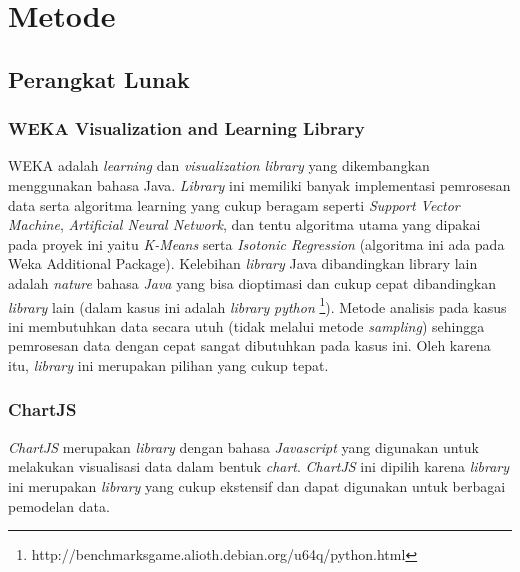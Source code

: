 \documentclass{article}
\begin{document}
\section{Metode}

\subsection{Perangkat Lunak}

\subsubsection{WEKA Visualization and Learning Library}
\begin{adjustwidth}{4em}{0pt}

\hspace{\parindent}WEKA adalah \textit{learning} dan \textit{visualization} \textit{library} yang dikembangkan menggunakan bahasa Java. \textit{Library} ini memiliki banyak implementasi pemrosesan data serta algoritma learning yang cukup beragam seperti \textit{Support Vector Machine}, \textit{Artificial Neural Network}, dan tentu algoritma utama yang dipakai pada proyek ini yaitu \textit{K-Means} serta \textit{Isotonic Regression} (algoritma ini ada pada Weka Additional Package). Kelebihan \textit{library} Java dibandingkan library lain adalah \textit{nature} bahasa \textit{Java} yang bisa dioptimasi dan cukup cepat dibandingkan \textit{library} lain (dalam kasus ini adalah \textit{library} \textit{python} \footnote{http://benchmarksgame.alioth.debian.org/u64q/python.html}). Metode analisis pada kasus ini membutuhkan data secara utuh (tidak melalui metode \textit{sampling}) sehingga pemrosesan data dengan cepat sangat dibutuhkan pada kasus ini. Oleh karena itu, \textit{library} ini merupakan pilihan yang cukup tepat.

\end{adjustwidth}

\subsubsection{ChartJS}
\begin{adjustwidth}{4em}{0pt}
	
\hspace{\parindent}\textit{ChartJS} merupakan \textit{library} dengan bahasa \textit{Javascript} yang digunakan untuk melakukan visualisasi data dalam bentuk \textit{chart}. \textit{ChartJS} ini dipilih karena \textit{library} ini merupakan \textit{library} yang cukup ekstensif dan dapat digunakan untuk berbagai pemodelan data.

\end{adjustwidth}
\end{document}

